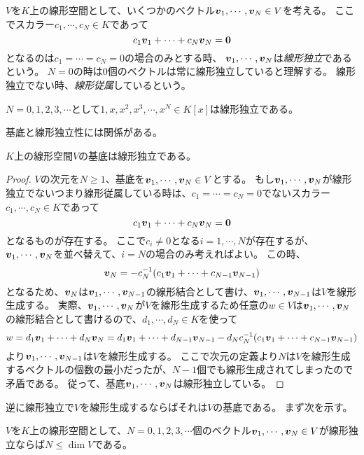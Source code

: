 \begin{definition}[線形独立]
$V$を$K$上の線形空間として、いくつかのベクトル$\vb*{v}_1, \cdots, \vb*{v}_N \in V$を考える。
ここでスカラー$c_1, \cdots, c_N \in K$であって
$$
c_1 \vb*{v}_1+\cdots+c_N \vb*{v}_N = \vb*{0}
$$
となるのは$c_1 = \cdots = c_N = 0$の場合のみとする時、
$\vb*{v}_1, \cdots, \vb*{v}_N$は\emph{線形独立}であるという。
$N = 0$の時は$0$個のベクトルは常に線形独立していると理解する。
線形独立でない時、\emph{線形従属}しているという。
\end{definition}

\begin{example}
$N = 0, 1, 2, 3, \cdots$として$1, x, x^2, x^3, \cdots, x^N \in K[x]$は線形独立である。
\end{example}

基底と線形独立性には関係がある。

\begin{proposition}
$K$上の線形空間$V$の基底は線形独立である。
\end{proposition}

\begin{proof}
$V$の次元を$N \ge 1$、基底を$\vb*{v}_1, \cdots, \vb*{v}_N \in V$とする。
もし$\vb*{v}_1, \cdots, \vb*{v}_N$が線形独立でないつまり線形従属している時は、$c_1 = \cdots = c_N = 0$でないスカラー$c_1, \cdots, c_N \in K$であって
$$
c_1 \vb*{v}_1+\cdots+c_N \vb*{v}_N = \vb*{0}
$$
となるものが存在する。
ここで$c_i \ne 0$となる$i = 1, \cdots, N$が存在するが、$\vb*{v}_1, \cdots, \vb*{v}_N$を並べ替えて、$i = N$の場合のみ考えればよい。
この時、
$$
\vb*{v}_N = -c_N^{-1}(c_1 \vb*{v}_1+\cdots+c_{N-1} \vb*{v}_{N-1})
$$
となるため、$\vb*{v}_N$は$\vb*{v}_1, \cdots, \vb*{v}_{N-1}$の線形結合として書け、$\vb*{v}_1, \cdots, \vb*{v}_{N-1}$は$V$を線形生成する。
実際、$\vb*{v}_1, \cdots, \vb*{v}_N$が$V$を線形生成するため任意の$w \in V$は$\vb*{v}_1, \cdots, \vb*{v}_N$の線形結合として書けるので、$d_1, \cdots, d_N \in K$を使って
$$
w = d_1\vb*{v}_1+\cdots+d_N\vb*{v}_N
= d_1\vb*{v}_1+\cdots+d_{N-1}\vb*{v}_{N-1}-d_N c_N^{-1}(c_1 \vb*{v}_1+\cdots+c_{N-1} \vb*{v}_{N-1})
$$
より$\vb*{v}_1, \cdots, \vb*{v}_{N-1}$は$V$を線形生成する。
ここで次元の定義より$N$は$V$を線形生成するベクトルの個数の最小だったが、$N-1$個でも線形生成されてしまったので矛盾である。
従って、基底$\vb*{v}_1, \cdots, \vb*{v}_N$は線形独立している。
\end{proof}

逆に線形独立で$V$を線形生成するならばそれは$V$の基底である。
まず次を示す。

\begin{lemma}[線形独立と次元]
$V$を$K$上の線形空間として、$N = 0, 1, 2, 3, \cdots$個のベクトル$\vb*{v}_1, \cdots, \vb*{v}_N \in V$が線形独立ならば$N \le \dim V$である。
\end{lemma}

